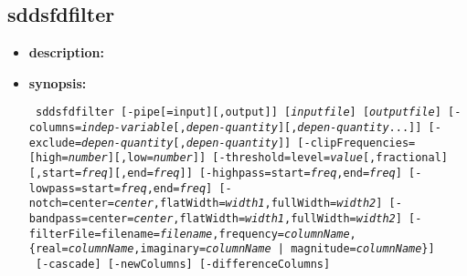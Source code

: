 \newpage 
 
\subsection{sddsfdfilter} 
\label{sddsfdfilter} 
 
\begin{itemize} 
\item {\bf description:} 
 
% 
% 

\item {\bf synopsis:}  
 
\begin{flushleft}{\tt 
sddsfdfilter [-pipe[=input][,output]] [{\em inputfile}] [{\em outputfile}] 
[-columns={\em indep-variable}[,{\em depen-quantity}][,{\em depen-quantity}...]] 
[-exclude={\em depen-quantity}[,{\em depen-quantity}]] 
[-clipFrequencies=[high={\em number}][,low={\em number}]] 
[-threshold=level={\em value}[,fractional][,start={\em freq}][,end={\em freq}]]  
[-highpass=start={\em freq},end={\em freq}] [-lowpass=start={\em freq},end={\em freq}] 
[-notch=center={\em center},flatWidth={\em width1},fullWidth={\em width2}]
[-bandpass=center={\em center},flatWidth={\em width1},fullWidth={\em width2}] 
[-filterFile=filename={\em filename},frequency={\em columnName},
  \{real={\em columnName},imaginary={\em columnName} | magnitude={\em columnName}\}]}
\\ {\tt
[-cascade] [-newColumns] [-differenceColumns] 
}\end{flushleft} 


\end{itemize}
